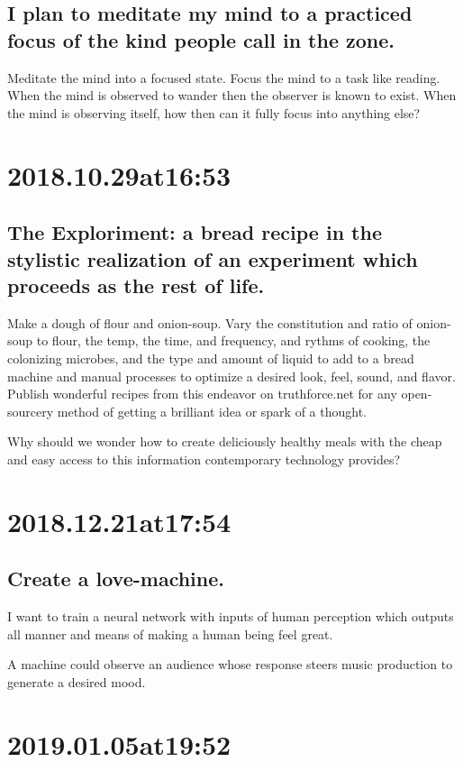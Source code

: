 \subsection*{ I plan to meditate my mind to a practiced focus of the kind people call in the zone. }
Meditate the mind into a focused state.
Focus the mind to a task like reading.
When the mind is observed to wander then the observer is known to exist.
When the mind is observing itself, how then can it fully focus into anything else?

\section*{ 2018.10.29at16:53 }
\subsection*{ The Exploriment: a bread recipe in the stylistic realization of an experiment  which proceeds as the rest of life. }
Make a dough of flour and onion-soup.
Vary the constitution and ratio of onion-soup to flour, the temp, the time, and frequency, and rythms of cooking, the colonizing microbes, and the type and amount of liquid to add to a bread machine and manual processes to optimize a desired look, feel, sound, and flavor.
Publish wonderful recipes from this endeavor on truthforce.net for any open-sourcery method of getting a brilliant idea or spark of a thought.

Why should we wonder how to create deliciously healthy meals with the cheap and easy access to this information contemporary technology provides?

\section*{ 2018.12.21at17:54 }
\subsection*{ Create a love-machine. }
I want to train a neural network with inputs of human perception which outputs all manner and means of making a human being feel great.

A machine could observe an audience whose response steers music production to generate a desired mood.

\section*{ 2019.01.05at19:52 }
